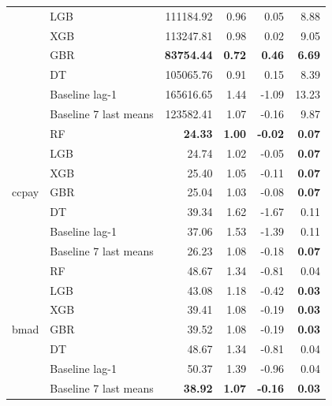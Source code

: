 \documentclass{article}
\begin{document}
\begin{longtable}{ll rrrr}
 & LGB & 111184.92 & 0.96 & 0.05 & 8.88 \\
 & XGB & 113247.81 & 0.98 & 0.02 & 9.05 \\
 & GBR & \textbf{83754.44} & \textbf{0.72} & \textbf{0.46} & \textbf{6.69} \\
 & DT & 105065.76 & 0.91 & 0.15 & 8.39 \\
 & Baseline lag-1 & 165616.65 & 1.44 & -1.09 & 13.23 \\
 & Baseline 7 last means & 123582.41 & 1.07 & -0.16 & 9.87 \\
\midrule
\multirow{7}{*}{ccpay} & RF & \textbf{24.33} & \textbf{1.00} & \textbf{-0.02} & \textbf{0.07} \\
 & LGB & 24.74 & 1.02 & -0.05 & \textbf{0.07} \\
 & XGB & 25.40 & 1.05 & -0.11 & \textbf{0.07} \\
 & GBR & 25.04 & 1.03 & -0.08 & \textbf{0.07} \\
 & DT & 39.34 & 1.62 & -1.67 & 0.11 \\
 & Baseline lag-1 & 37.06 & 1.53 & -1.39 & 0.11 \\
 & Baseline 7 last means & 26.23 & 1.08 & -0.18 & \textbf{0.07} \\
\midrule
\multirow{7}{*}{bmad} & RF & 48.67 & 1.34 & -0.81 & 0.04 \\
 & LGB & 43.08 & 1.18 & -0.42 & \textbf{0.03} \\
 & XGB & 39.41 & 1.08 & -0.19 & \textbf{0.03} \\
 & GBR & 39.52 & 1.08 & -0.19 & \textbf{0.03} \\
 & DT & 48.67 & 1.34 & -0.81 & 0.04 \\
 & Baseline lag-1 & 50.37 & 1.39 & -0.96 & 0.04 \\
 & Baseline 7 last means & \textbf{38.92} & \textbf{1.07} & \textbf{-0.16} & \textbf{0.03} \\
\end{longtable}
\end{document}
